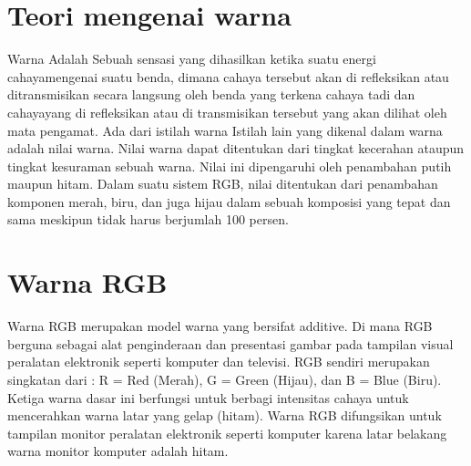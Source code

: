 \section{Teori mengenai warna}
Warna Adalah Sebuah sensasi yang dihasilkan ketika suatu energi cahayamengenai suatu benda, dimana cahaya tersebut akan di refleksikan atau ditransmisikan secara langsung oleh benda yang terkena cahaya tadi dan cahayayang di refleksikan atau di transmisikan tersebut yang akan dilihat oleh mata pengamat. Ada dari istilah warna Istilah lain yang dikenal dalam warna adalah nilai warna. Nilai warna dapat ditentukan dari tingkat kecerahan ataupun tingkat kesuraman sebuah warna. Nilai ini dipengaruhi oleh penambahan putih maupun hitam. Dalam suatu sistem RGB, nilai ditentukan dari penambahan komponen merah, biru, dan juga hijau dalam sebuah komposisi yang tepat dan sama meskipun tidak harus berjumlah 100 persen.

\section{Warna RGB}
Warna RGB merupakan  model warna yang bersifat additive. Di mana RGB berguna sebagai  alat penginderaan dan presentasi gambar pada tampilan visual peralatan elektronik seperti komputer dan televisi. RGB sendiri merupakan singkatan dari : R = Red (Merah), G = Green (Hijau), dan B = Blue (Biru). Ketiga warna dasar ini berfungsi untuk berbagi intensitas cahaya untuk mencerahkan warna latar yang gelap (hitam).  Warna RGB difungsikan untuk tampilan monitor peralatan elektronik seperti komputer karena latar belakang warna monitor komputer adalah hitam.
